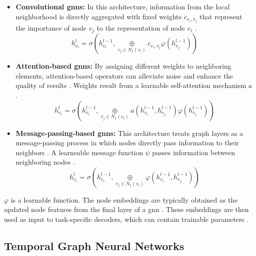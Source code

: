 \begin{itemize}
    \item \textbf{Convolutional \glspl{gnn}:} In this architecture, information from the local neighborhood is directly aggregated with fixed weights $c_{v_i, v_j}$ that represent the importance of node $v_j$ to the representation of node $v_i$ \cite{bronstein_geometric_2021, wu_comprehensive_2021}.
    \begin{equation}
        h_{v_i}^l = \sigma(h_{v_i}^{l-1}, \underset{v_j \in N_1(v_i)}{\oplus} c_{v_i, v_j} \varphi(h_{v_j}^{l-1}))
    \end{equation}
    
    \item \textbf{Attention-based \glspl{gnn}:} By assigning different weights to neighboring elements, attention-based operators can alleviate noise and enhance the quality of results \cite{zhou_graph_2020}. Weights result from a learnable self-attention mechanism $a$ \cite{bronstein_geometric_2021}.
    \begin{equation}
        h_{v_i}^l = \sigma(h_{v_i}^{l-1}, \underset{v_j \in N_1(v_i)}{\oplus} a(h_{v_i}^{l-1}, h_{v_j}^{l-1}) \varphi(h_{v_j}^{l-1}))
    \end{equation}

    \item \textbf{Message-passing-based \glspl{gnn}:} This architecture treats graph layers as a message-passing process in which nodes directly pass information to their neighbors \cite{wu_comprehensive_2021}. A learneable message function $\psi$ passes information between neighboring nodes \cite{bronstein_geometric_2021}.
    \begin{equation}
        h_{v_i}^l = \sigma(h_{v_i}^{l-1}, \underset{v_j \in N_1(v_i)}{\oplus} \varphi(h_{v_i}^{l-1}, h_{v_j}^{l-1}))
    \end{equation}
\end{itemize}

$\varphi$ is a learnable function. The node embeddings are typically obtained as the updated node features from the final layer of a \gls{gnn} \cite{hamilton_representation_2017}. These embeddings are then used as input to task-specific decoders, which can contain trainable parameters \cite{hamilton_representation_2017}.

\subsection{Temporal Graph Neural Networks}
\label{s_Background_TGNNs}

